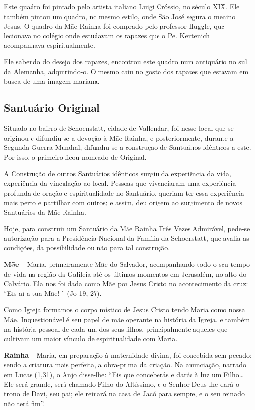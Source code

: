 \documentclass[a4paper,14pt]{extarticle} \usepackage[utf8]{inputenc}
\begin{document}
Este quadro foi pintado pelo artista italiano Luigi Cróssio, no século XIX. Ele também pintou um quadro, no mesmo estilo, onde São José segura o menino Jesus. O quadro da Mãe Rainha foi comprado pelo professor Huggle, que lecionava no colégio onde estudavam os rapazes que o Pe. Kentenich acompanhava espiritualmente.

Ele sabendo do desejo dos rapazes, encontrou este quadro num antiquário no sul da Alemanha, adquirindo-o. O mesmo caiu no gosto dos rapazes que estavam em busca de uma imagem mariana.

\subsection{Santuário Original}

Situado no bairro de Schoenstatt, cidade de Vallendar, foi nesse local que se originou e difundiu-se a devoção à Mãe Rainha, e posteriormente, durante a Segunda Guerra Mundial, difundiu-se a construção de Santuários idênticos a este. Por isso, o primeiro ficou nomeado de Original.

A Construção de outros Santuários idênticos surgiu da experiência da vida, experiência da vinculação ao local. Pessoas que vivenciaram uma experiência profunda de oração e espiritualidade no Santuário, queriam ter essa experiência mais perto e partilhar com outros; e assim, deu origem ao surgimento de novos Santuários da Mãe Rainha.

Hoje, para construir um Santuário da Mãe Rainha Três Vezes Admirável, pede-se autorização para a Presidência Nacional da Família da Schoenstatt, que avalia as condições, da possibilidade ou não para tal construção.

\textbf{Mãe} – Maria, primeiramente Mãe do Salvador, acompanhando todo o seu tempo de vida na região da Galileia até os últimos momentos em Jerusalém, no alto do Calvário. Ela nos foi dada como Mãe por Jesus Cristo no acontecimento da cruz: “Eis ai a tua Mãe! ” (Jo 19, 27).

Como Igreja formamos o corpo místico de Jesus Cristo tendo Maria como nossa Mãe. Inquestionável é seu papel de mãe operante na história da Igreja, e também na história pessoal de cada um dos seus filhos, principalmente aqueles que cultivam um maior vínculo de espiritualidade com Maria.

\textbf{Rainha} – Maria, em preparação à maternidade divina, foi concebida sem pecado; sendo a criatura mais perfeita, a obra-prima da criação. Na anunciação, narrado em Lucas (1,31), o Anjo disse-lhe: “Eis que conceberás e darás à luz um Filho… Ele será grande, será chamado Filho do Altíssimo, e o Senhor Deus lhe dará o trono de Davi, seu pai; ele reinará na casa de Jacó para sempre, e o seu reinado não terá fim”.
\end{document}
